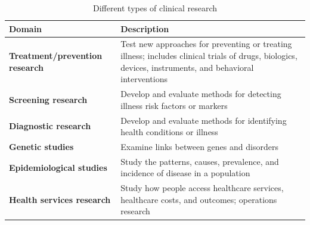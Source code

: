 \documentclass[
  letterpaper,
  DIV=11,
  numbers=noendperiod,
  oneside]{scrreprt}
\begin{document}
\vspace{2em}

\hypertarget{tbl-clinical}{}
\begin{table}

\caption{\label{tbl-clinical}Different types of clinical research }
\begin{tabular}[t]{>{\raggedright\arraybackslash}p{5cm}>{\raggedright\arraybackslash}p{10.5cm}}
\toprule
\textbf{Domain} & \textbf{Description}\\
\midrule
\textbf{Treatment/prevention research} & Test new approaches for preventing or treating illness; includes clinical trials of drugs, biologics, devices, instruments, and behavioral interventions\\
\textbf{Screening research} & Develop and evaluate methods for detecting illness risk factors or markers\\
\textbf{Diagnostic research} & Develop and evaluate methods for identifying health conditions or illness\\
\textbf{Genetic studies} & Examine links between genes and disorders\\
\textbf{Epidemiological studies} & Study the patterns, causes, prevalence, and incidence of disease in a population\\
\addlinespace
\textbf{Health services research} & Study how people access healthcare services, healthcare costs, and outcomes; operations research\\
\bottomrule
\end{tabular}
\end{table}

\vspace{2em}

\newpage

\end{document}
